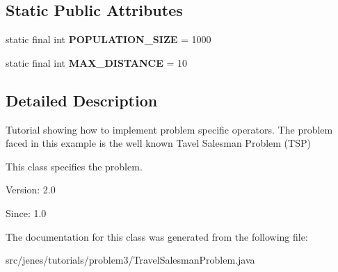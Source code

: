 \subsection*{Static Public Attributes}
\begin{CompactItemize}
\item 
\hypertarget{classjenes_1_1tutorials_1_1problem3_1_1_travel_salesman_problem_fda171e13788bcb67f73fd82bd89498b}{
static final int \textbf{POPULATION\_\-SIZE} = 1000}
\label{classjenes_1_1tutorials_1_1problem3_1_1_travel_salesman_problem_fda171e13788bcb67f73fd82bd89498b}

\item 
\hypertarget{classjenes_1_1tutorials_1_1problem3_1_1_travel_salesman_problem_94747a5d97d1f3974d74a27e641285c8}{
static final int \textbf{MAX\_\-DISTANCE} = 10}
\label{classjenes_1_1tutorials_1_1problem3_1_1_travel_salesman_problem_94747a5d97d1f3974d74a27e641285c8}

\end{CompactItemize}


\subsection{Detailed Description}
Tutorial showing how to implement problem specific operators. The problem faced in this example is the well known Tavel Salesman Problem (TSP)

This class specifies the problem.

\begin{Desc}
\item[Version:]2.0 \end{Desc}
\begin{Desc}
\item[Since:]1.0 \end{Desc}


The documentation for this class was generated from the following file:\begin{CompactItemize}
\item 
src/jenes/tutorials/problem3/TravelSalesmanProblem.java\end{CompactItemize}
